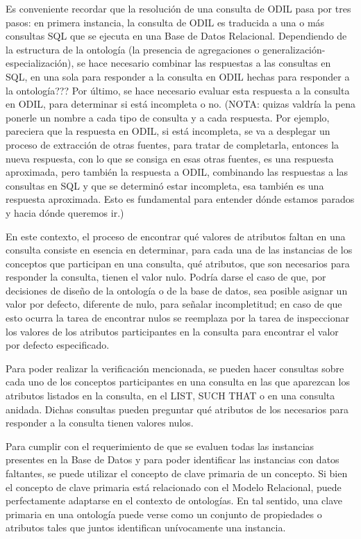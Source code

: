 	Es conveniente recordar que la resolución de una consulta de ODIL pasa por tres pasos: en primera instancia, la consulta de ODIL es traducida a una o más consultas SQL que se ejecuta en una Base de Datos Relacional. Dependiendo de la estructura de la ontología (la presencia de agregaciones o generalización-especialización), se hace necesario combinar  las respuestas a las consultas en SQL, en una sola para responder a la consulta en ODIL hechas para responder a la ontología??? Por último, se hace necesario evaluar esta respuesta a la consulta en ODIL, para determinar si está incompleta o no. (NOTA: quizas valdría la pena ponerle un nombre a cada tipo de consulta y a cada respuesta. Por ejemplo, pareciera que la respuesta en ODIL, si está incompleta, se va a desplegar un proceso de extracción de otras fuentes, para tratar de completarla, entonces la nueva respuesta, con lo que se consiga en esas otras fuentes, es una respuesta aproximada, pero también la respuesta a ODIL, combinando las respuestas a las consultas en SQL y que se determinó estar incompleta, esa también es una respuesta aproximada. Esto es fundamental para entender dónde estamos parados y hacia dónde queremos ir.)

En este contexto, el proceso de encontrar qué valores de atributos faltan en una consulta consiste en esencia en determinar, para cada una de las instancias de los conceptos que participan en una consulta, qué atributos, que son necesarios para responder la consulta, tienen el valor nulo. Podría darse el caso de que, por decisiones de diseño de la ontología o de la base de datos, sea posible asignar un valor por defecto, diferente de nulo, para señalar incompletitud; en caso de que esto ocurra la tarea de encontrar nulos se reemplaza por la tarea de inspeccionar los valores de los atributos participantes en la consulta para encontrar el valor por defecto especificado.

Para poder realizar la verificación mencionada, se pueden hacer consultas sobre cada uno de los conceptos participantes en una consulta en las que aparezcan los atributos listados en la consulta, en el LIST, SUCH THAT o en una consulta anidada. Dichas consultas pueden preguntar qué atributos de los necesarios para responder a la consulta tienen valores nulos.

Para cumplir con el requerimiento de que se evaluen todas las instancias presentes en la Base de Datos y para poder identificar las instancias con datos faltantes, se puede utilizar el concepto de clave primaria de un concepto. Si bien el concepto de clave primaria está relacionado con el Modelo Relacional, puede perfectamente adaptarse en el contexto de ontologías. En tal sentido, una clave primaria en una ontología puede verse como un conjunto de propiedades o atributos tales que juntos identifican unívocamente una instancia.


